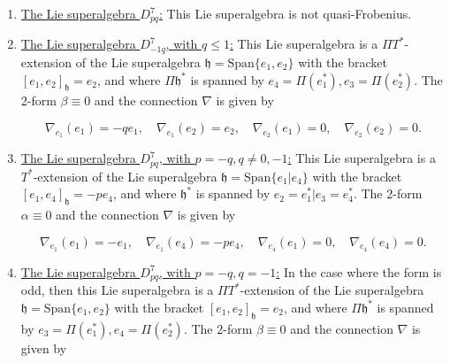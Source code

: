 \documentclass[12pt]{amsart}
\newcommand{\fh}{\mathfrak{h}}
\begin{document}
\begin{enumerate}
Thus, the Lie superalgebra $D^6$ is a $\Pi T^*$-extension of the Lie superalgebra $\mathfrak{h}$,  where $\Pi \mathfrak{h}^*$ is spanned by $e_3 = \Pi(e_1^*) | e_4 = \Pi(e_2^*)$.  The 2-form $\beta \equiv 0$. 
   
    
    \item \underline{The Lie superalgebra $D^{7}_{pq}$:} This Lie superalgebra is not quasi-Frobenius.\\

    \item \underline{The Lie superalgebra $D^{7}_{-1q}$, with $q\le1$:} This Lie superalgebra is a $\Pi T^*$-extension of the Lie superalgebra $\mathfrak{h}=\mathrm{Span}\{e_1 , e_2\}$ with the bracket $[e_1,e_2]_{\fh} = e_2$, and where $\Pi \mathfrak{h}^*$ is spanned by $e_4 = \Pi(e_1^*) , e_3 = \Pi(e_2^*)$. The 2-form $\beta \equiv 0$ and the connection $\nabla$ is given by
    
    \[\nabla_{e_1}(e_1) = -qe_1,\quad  \nabla_{e_1}(e_2) = e_2, \quad  \nabla_{e_2}(e_1) = 0, \quad \nabla_{e_2}(e_2) = 0.\]

    
    
    \item \underline{The Lie superalgebra $D^{7}_{pq}$, with $p=-q, q\neq 0, -1 $:} This Lie superalgebra is a $T^*$-extension of the Lie superalgebra $\mathfrak{h}=\mathrm{Span}\{e_1 | e_4\}$ with the bracket $[e_1,e_4]_\fh = -pe_4$, and where $\mathfrak{h}^*$ is spanned by $e_2 = e_1^{*}|e_3 = e_4^{*}$. The 2-form $\alpha \equiv 0$ and the connection $\nabla$ is given by
    
    \[\nabla_{e_1}(e_1) = -e_1,\quad  \nabla_{e_1}(e_4) = -pe_4, \quad  \nabla_{e_4}(e_1) = 0, \quad \nabla_{e_4}(e_4) = 0.\]

    \item \underline{The Lie superalgebra $D^{7}_{pq}$, with $p=-q, q= -1 $:} In the case where the form is odd, then this Lie superalgebra is a $\Pi T^*$-extension of the Lie superalgebra $\mathfrak{h}=\mathrm{Span}\{e_1 ,  e_2\}$ with the bracket $[e_1,e_2]_\fh = e_2$, and where $\Pi \mathfrak{h}^*$ is spanned by $e_3 = \Pi(e_1^{*}) ,  e_4 = \Pi(e_2^{*})$. The 2-form $\beta \equiv 0$ and the connection $\nabla$ is given by
    

\end{enumerate}
\end{document}
